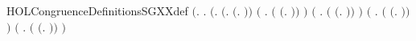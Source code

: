 \newcommand{\HOLCongruenceDefinitionsSEQXXdef}{\UseVerbatim{HOLCongruenceDefinitionsSEQXXdef}}
\begin{SaveVerbatim}{HOLCongruenceDefinitionsSGXXdef}
\HOLTokenTurnstile{}  \HOLSymConst{\ensuremath{=}}
   \ensuremath{(}\HOLTokenLambda{}.
        \HOLSymConst{\HOLTokenForall{}}.
            \ensuremath{(}\HOLSymConst{\HOLTokenForall{}}.
                 \ensuremath{(}\HOLSymConst{\HOLTokenExists{}}.  \HOLSymConst{\ensuremath{=}} \ensuremath{(}\HOLTokenLambda{}. \ensuremath{)}\ensuremath{)} \HOLSymConst{\HOLTokenDisj{}}
                 \ensuremath{(}\HOLSymConst{\HOLTokenExists{}} . \ensuremath{(} \HOLSymConst{\ensuremath{=}} \ensuremath{(}\HOLTokenLambda{}.  \HOLSymConst{\ensuremath{\ldotp}} \ensuremath{)}\ensuremath{)} \HOLSymConst{\HOLTokenConj{}}  \ensuremath{)} \HOLSymConst{\HOLTokenDisj{}}
                 \ensuremath{(}\HOLSymConst{\HOLTokenExists{}} . \ensuremath{(} \HOLSymConst{\ensuremath{=}} \ensuremath{(}\HOLTokenLambda{}. \HOLSymConst{\ensuremath{\ldotp}} \ensuremath{)}\ensuremath{)} \HOLSymConst{\HOLTokenConj{}}  \ensuremath{)} \HOLSymConst{\HOLTokenDisj{}}
                 \ensuremath{(}\HOLSymConst{\HOLTokenExists{}} .
                      \ensuremath{(} \HOLSymConst{\ensuremath{=}} \ensuremath{(}\HOLTokenLambda{}.   \HOLSymConst{\ensuremath{+}}  \ensuremath{)}\ensuremath{)} \HOLSymConst{\HOLTokenConj{}}   \HOLSymConst{\HOLTokenConj{}}  \ensuremath{)} \HOLSymConst{\HOLTokenDisj{}}
                 \ensuremath{(}\HOLSymConst{\HOLTokenExists{}} .
                      \ensuremath{(} \HOLSymConst{\ensuremath{=}} \ensuremath{(}\HOLTokenLambda{}.   \HOLSymConst{\ensuremath{\mid}}  \ensuremath{)}\ensuremath{)} \HOLSymConst{\HOLTokenConj{}}   \HOLSymConst{\HOLTokenConj{}}  \ensuremath{)} \HOLSymConst{\HOLTokenDisj{}}

\end{SaveVerbatim}
